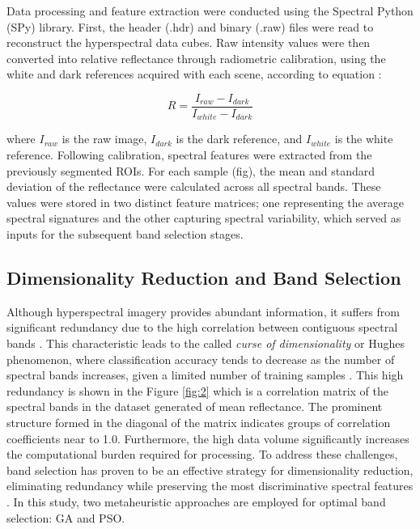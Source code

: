 \documentclass[runningheads]{llncs}
\begin{document}
Data processing and feature extraction were conducted using the Spectral Python (SPy) library. 
First, the header (.hdr) and binary (.raw) files were read to reconstruct the hyperspectral data cubes. 
Raw intensity values were then converted into relative reflectance through radiometric calibration, using the white and dark references acquired with each scene, according to equation \cite{morales_laboratory_2022}:

\begin{equation}
    R=\dfrac{I_{raw}-I_{dark}}{I_{white}-I_{dark}}
\end{equation}

where $I_{raw}$ is the raw image, $I_{dark}$ is the dark reference, and $I_{white}$ is the white reference. 
Following calibration, spectral features were extracted from the previously segmented ROIs. 
For each sample (fig), the mean and standard deviation of the reflectance were calculated across all spectral bands. 
These values were stored in two distinct feature matrices; one representing the average spectral signatures and the other capturing spectral variability, which served as inputs for the subsequent band selection stages.

\subsection{Dimensionality Reduction and Band Selection}

Although hyperspectral imagery provides abundant information, it suffers from significant redundancy due to the high correlation between contiguous spectral bands \cite{sawant_survey_2020}. 
This characteristic leads to the called \textit{curse of dimensionality} or Hughes phenomenon, where classification accuracy tends to decrease as the number of spectral bands increases, given a limited number of training samples \cite{hughes_mean_1968}. 
This high redundancy is shown in the Figure \ref{fig:2} which is a correlation matrix of the spectral bands in the dataset generated of mean reflectance. 
The prominent structure formed in the diagonal of the matrix indicates groups of correlation coefficients near to 1.0. 
Furthermore, the high data volume significantly increases the computational burden required for processing. 
To address these challenges, band selection has proven to be an effective strategy for dimensionality reduction, eliminating redundancy while preserving the most discriminative spectral features \cite{sawant_survey_2020, nagasubramanian_hyperspectral_2018}. 
In this study, two metaheuristic approaches are employed for optimal band selection: GA and PSO. 
\end{document}
